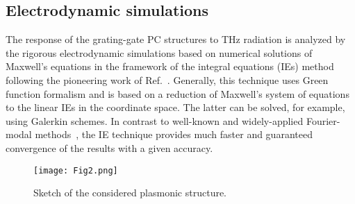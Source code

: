 \documentclass[%
 reprint,
 amsmath,amssymb,
 aps,
]{revtex4-2}
\begin{document}
\subsection{Electrodynamic simulations}

The response of the grating-gate PC structures to THz radiation is analyzed by the rigorous electrodynamic simulations based on numerical solutions of Maxwell’s equations in the framework of the integral equations (IEs) method following the pioneering work of  Ref.~\cite{Popov2010}. Generally, this technique uses Green function formalism and is based on a reduction of Maxwell’s system of equations to the linear IEs in the coordinate space. The latter can be solved, for example, using Galerkin schemes. In contrast to well-known and widely-applied Fourier-modal methods~\cite{Gaylord, KorRCWA2021},
the IE technique provides much faster and guaranteed convergence of the results with a given accuracy.
\begin{figure}[t!!!]
\texttt{[image: Fig2.png]}
\caption{Sketch of the considered plasmonic structure.}
\label{Fig2}
\end{figure}
\end{document}
